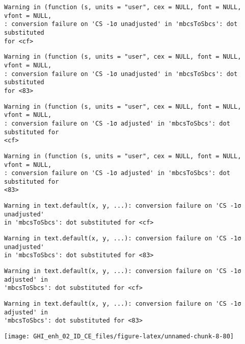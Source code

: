 \documentclass[
  10pt,
  a4paper,oneside]{article}
\begin{document}
\begin{verbatim}
Warning in (function (s, units = "user", cex = NULL, font = NULL, vfont = NULL,
: conversion failure on 'CS -1σ unadjusted' in 'mbcsToSbcs': dot substituted
for <cf>
\end{verbatim}

\begin{verbatim}
Warning in (function (s, units = "user", cex = NULL, font = NULL, vfont = NULL,
: conversion failure on 'CS -1σ unadjusted' in 'mbcsToSbcs': dot substituted
for <83>
\end{verbatim}

\begin{verbatim}
Warning in (function (s, units = "user", cex = NULL, font = NULL, vfont = NULL,
: conversion failure on 'CS -1σ adjusted' in 'mbcsToSbcs': dot substituted for
<cf>
\end{verbatim}

\begin{verbatim}
Warning in (function (s, units = "user", cex = NULL, font = NULL, vfont = NULL,
: conversion failure on 'CS -1σ adjusted' in 'mbcsToSbcs': dot substituted for
<83>
\end{verbatim}

\begin{verbatim}
Warning in text.default(x, y, ...): conversion failure on 'CS -1σ unadjusted'
in 'mbcsToSbcs': dot substituted for <cf>
\end{verbatim}

\begin{verbatim}
Warning in text.default(x, y, ...): conversion failure on 'CS -1σ unadjusted'
in 'mbcsToSbcs': dot substituted for <83>
\end{verbatim}

\begin{verbatim}
Warning in text.default(x, y, ...): conversion failure on 'CS -1σ adjusted' in
'mbcsToSbcs': dot substituted for <cf>
\end{verbatim}

\begin{verbatim}
Warning in text.default(x, y, ...): conversion failure on 'CS -1σ adjusted' in
'mbcsToSbcs': dot substituted for <83>
\end{verbatim}

\begin{center}\texttt{[image: GHI\_enh\_02\_ID\_CE\_files/figure-latex/unnamed-chunk-8-80]} \end{center}
\end{document}
